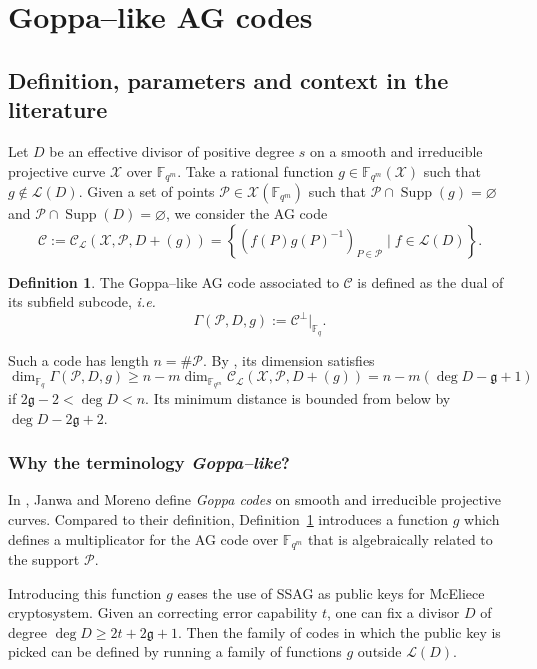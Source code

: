 \documentclass[a4paper]{article}
\theoremstyle{definition}
\newtheorem{definition}[thm]{Definition}
\theoremstyle{remark}
\newcommand{\calP}{\mathcal{P}}
\newcommand{\calL}{\mathcal{L}}
\newcommand{\calC}{\mathcal{C}}
\newcommand{\calX}{\mathcal{X}}
\newcommand{\fqm}{\mathbb{F}_{q^m}}
\newcommand{\fq}{\mathbb{F}_{q}}
\newcommand{\set}[1]{\left\{#1\right\}}
\newcommand{\Supp}{\operatorname{Supp}}
\begin{document}
\section{Goppa--like AG codes}\label{sec:Goppa}
\subsection{Definition, parameters and context in the literature}\label{subsec:def-Goppa}
Let $D$ be an effective divisor of positive degree $s$ on a smooth and irreducible projective curve $\calX$ over $\fqm$. Take a rational function $g \in \fqm(\calX)$ such that $g \notin \calL(D)$. Given a set of points $\calP \in \calX(\fqm)$ such that $\calP \cap \Supp(g) = \varnothing$ and $\calP \cap \Supp(D) = \varnothing$, we consider the AG code
\[\calC := \calC_{\calL}(\calX,\calP,D+(g))=\set{\left(f(P)g(P)^{-1}\right)_{P \in \calP} \mid f \in \calL(D)}.\]
\begin{definition} \label{def:Goppa--like_AG_code}
The Goppa--like AG code associated to $\calC$ is defined as the dual of its subfield subcode, \emph{i.e.}
\[ \Gamma(\calP,D,g) := \calC^{\perp}|_{\fq}.\]
\end{definition}%
%
Such a code has length $n = \# \calP$. By \cite[Theorem~1]{JM96}, its dimension satisfies 
\[\dim_{\fq} \Gamma(\calP,D,g) \geq n-m \dim_{\fqm} \calC_{\calL}(\calX,\calP,D+(g)) =n-m(\deg D - \mathfrak{g} +1 )\]
if $2\mathfrak{g} - 2 < \deg D < n$. Its minimum distance is bounded from below by $\deg D - 2 \mathfrak{g} + 2$.




\subsubsection{Why the terminology \textit{Goppa--like}?}

In \cite{JM96}, Janwa and Moreno define \emph{Goppa codes} on smooth and irreducible projective curves. Compared to their definition, Definition~\ref{def:Goppa--like_AG_code} introduces a function $g$ which defines a multiplicator for the AG code over $\fqm$ that is algebraically related to the support $\calP$.

Introducing this function $g$ eases the use of SSAG as public keys for McEliece cryptosystem. Given an correcting error capability $t$, one can fix a divisor $D$ of degree $\deg D \geq 2t + 2\mathfrak{g}+1$. Then the family of codes in which the public key is picked can be defined by running a family of functions $g$ outside $\calL(D)$.
\end{document}
